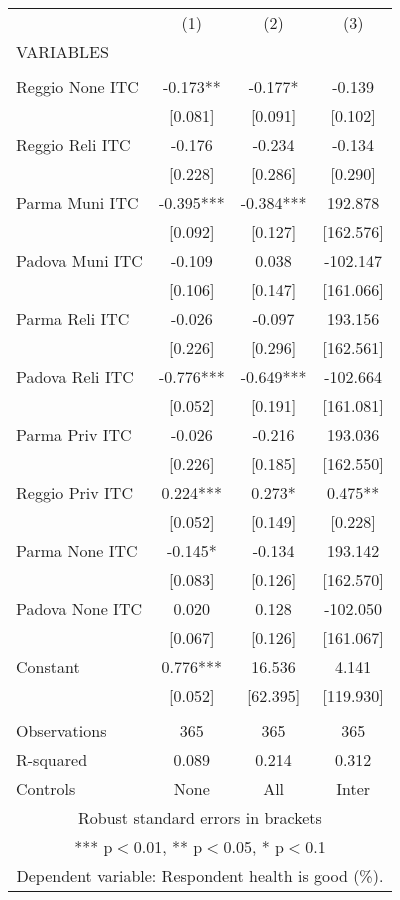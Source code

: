 \begin{tabular}{lccc} \hline
 & (1) & (2) & (3) \\
VARIABLES &  &  &  \\ \hline
 &  &  &  \\
Reggio None ITC & -0.173** & -0.177* & -0.139 \\
 & [0.081] & [0.091] & [0.102] \\
Reggio Reli ITC & -0.176 & -0.234 & -0.134 \\
 & [0.228] & [0.286] & [0.290] \\
Parma Muni ITC & -0.395*** & -0.384*** & 192.878 \\
 & [0.092] & [0.127] & [162.576] \\
Padova Muni ITC & -0.109 & 0.038 & -102.147 \\
 & [0.106] & [0.147] & [161.066] \\
Parma Reli ITC & -0.026 & -0.097 & 193.156 \\
 & [0.226] & [0.296] & [162.561] \\
Padova Reli ITC & -0.776*** & -0.649*** & -102.664 \\
 & [0.052] & [0.191] & [161.081] \\
Parma Priv ITC & -0.026 & -0.216 & 193.036 \\
 & [0.226] & [0.185] & [162.550] \\
Reggio Priv ITC & 0.224*** & 0.273* & 0.475** \\
 & [0.052] & [0.149] & [0.228] \\
Parma None ITC & -0.145* & -0.134 & 193.142 \\
 & [0.083] & [0.126] & [162.570] \\
Padova None ITC & 0.020 & 0.128 & -102.050 \\
 & [0.067] & [0.126] & [161.067] \\
Constant & 0.776*** & 16.536 & 4.141 \\
 & [0.052] & [62.395] & [119.930] \\
 &  &  &  \\
Observations & 365 & 365 & 365 \\
R-squared & 0.089 & 0.214 & 0.312 \\
 Controls & None & All & Inter \\ \hline
\multicolumn{4}{c}{ Robust standard errors in brackets} \\
\multicolumn{4}{c}{ *** p$<$0.01, ** p$<$0.05, * p$<$0.1} \\
\multicolumn{4}{c}{ Dependent variable: Respondent health is good (\%).} \\
\end{tabular}
